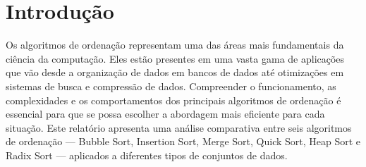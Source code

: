 \section{Introdução}
Os algoritmos de ordenação representam uma das áreas mais fundamentais da ciência da computação. Eles estão presentes em uma vasta gama de aplicações que vão desde a organização de dados em bancos de dados até otimizações em sistemas de busca e compressão de dados. Compreender o funcionamento, as complexidades e os comportamentos dos principais algoritmos de ordenação é essencial para que se possa escolher a abordagem mais eficiente para cada situação. Este relatório apresenta uma análise comparativa entre seis algoritmos de ordenação — Bubble Sort, Insertion Sort, Merge Sort, Quick Sort, Heap Sort e Radix Sort — aplicados a diferentes tipos de conjuntos de dados.
